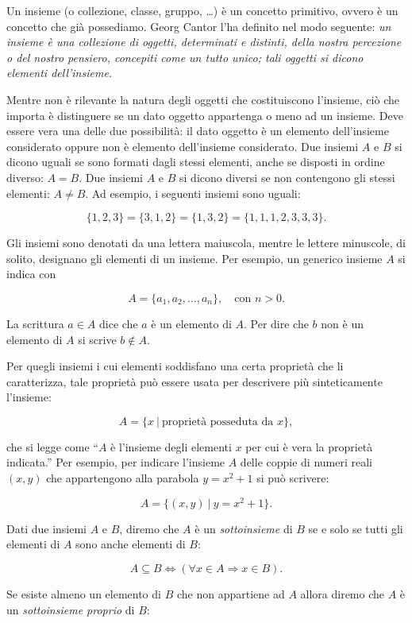 \documentclass[
  11pt,
]{krantz}
\theoremstyle{definition}
\theoremstyle{definition}
\theoremstyle{definition}
\theoremstyle{definition}
\theoremstyle{remark}
\begin{document}
Un insieme (o collezione, classe, gruppo, \ldots) è un concetto primitivo, ovvero è un concetto che già possediamo. Georg Cantor l'ha definito nel modo seguente: \emph{un insieme è una collezione di oggetti, determinati e distinti, della nostra percezione o del nostro pensiero, concepiti come un tutto unico; tali oggetti si dicono elementi dell'insieme.}

Mentre non è rilevante la natura degli oggetti che costituiscono l'insieme, ciò che importa è distinguere se un dato oggetto appartenga o meno ad un insieme. Deve essere vera una delle due possibilità: il dato oggetto è un elemento dell'insieme considerato oppure non è elemento dell'insieme considerato. Due insiemi \(A\) e \(B\) si dicono uguali se sono formati dagli stessi elementi, anche se disposti in ordine diverso: \(A=B\). Due insiemi \(A\) e \(B\) si dicono diversi se non contengono gli stessi elementi: \(A \neq B\). Ad esempio, i seguenti insiemi sono uguali:

\[
\{1, 2, 3\} = \{3, 1, 2\} = \{1, 3, 2\}= \{1, 1, 1, 2, 3, 3, 3\}.
\]

Gli insiemi sono denotati da una lettera maiuscola, mentre le lettere minuscole, di solito, designano gli elementi di un insieme. Per esempio, un generico insieme \(A\) si indica con

\[
A = \{a_1, a_2, \dots, a_n\}, \quad \text{con~} n > 0.
\]

La scrittura \(a \in A\) dice che \(a\) è un elemento di \(A\). Per dire che \(b\) non è un elemento di \(A\) si scrive \(b \notin A.\)

Per quegli insiemi i cui elementi soddisfano una certa proprietà che li caratterizza, tale proprietà può essere usata per descrivere più sinteticamente l'insieme:

\[
A = \{x ~\vert~ \text{proprietà posseduta da~} x\},
\]

che si legge come ``\(A\) è l'insieme degli elementi \(x\) per cui è vera la proprietà indicata.'' Per esempio, per indicare l'insieme \(A\) delle coppie di numeri reali \((x,y)\) che appartengono alla parabola \(y = x^2 + 1\) si può scrivere:

\[
A = \{(x,y) ~\vert~ y = x^2 + 1\}.
\]

Dati due insiemi \(A\) e \(B\), diremo che \(A\) è un \emph{sottoinsieme} di \(B\) se e solo se tutti gli elementi di \(A\) sono anche elementi di \(B\):

\[
A \subseteq B \iff (\forall x \in A \Rightarrow x \in B).
\]

Se esiste almeno un elemento di \(B\) che non appartiene ad \(A\) allora diremo che \(A\) è un \emph{sottoinsieme proprio} di \(B\):
\end{document}
